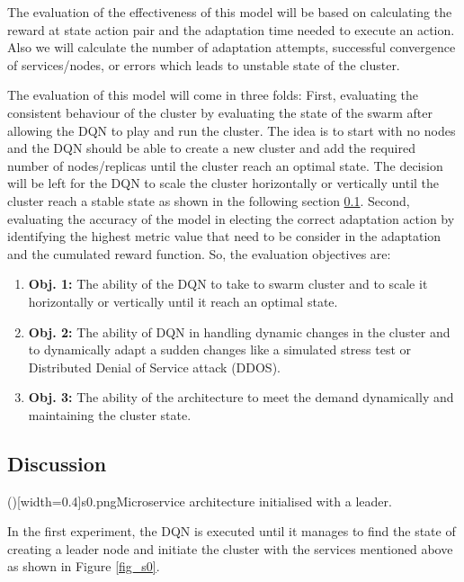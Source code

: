 \documentclass{ieeeaccess}
\begin{document}
The evaluation of the effectiveness of this model will be based on calculating the reward at state action pair and the adaptation time needed to execute an action. Also we will calculate the number of adaptation attempts, successful convergence of services/nodes, or errors which leads to unstable state of the cluster. 


The evaluation of this model will come in three folds: First, evaluating the consistent behaviour of the cluster by evaluating the state of the swarm after allowing the DQN to play and run the cluster. The idea is to start with no nodes and the DQN should be able to create a new cluster and add the required number of nodes/replicas until the cluster reach an optimal state. The decision will be left for the DQN to scale the cluster horizontally or vertically until the cluster reach a stable state as shown in the following section \ref{sec:disc}. Second, evaluating the accuracy of the model in electing the correct adaptation action by identifying the highest metric value that need to be consider in the adaptation and the cumulated reward function. 
 So, the evaluation objectives are:
 \begin{enumerate}
 \item \textbf{Obj. 1:} The ability of the DQN to take to swarm cluster and to scale it horizontally or vertically until it reach an optimal state.
 \item \textbf{Obj. 2:} The ability of DQN in handling dynamic changes in the cluster and to dynamically adapt a sudden changes like a simulated stress test or Distributed Denial of Service attack (DDOS). 
 \item \textbf{Obj. 3:} The ability of the architecture to meet the demand dynamically and maintaining the cluster state. 
 \end{enumerate}
 
 \subsection{Discussion}
\label{sec:disc}


 \Figure[!t]()[width=0.4\textwidth]{s0.png}{Microservice architecture initialised with a leader.  \label{fig_s0}}
 
In the first experiment,  the DQN is executed until it manages to find the state of creating a leader node and initiate the cluster with the services mentioned above as shown in Figure \ref{fig_s0}. 

 
\end{document}

